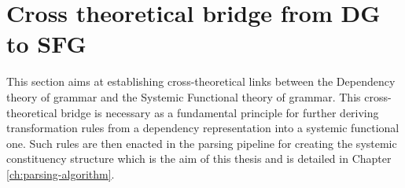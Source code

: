 
\section{Cross theoretical bridge from DG to SFG}
\label{sec:cross-theoretical-bridge}
    


%
    This section aims at establishing cross-theoretical links between the Dependency theory of grammar and the Systemic Functional theory of grammar. This cross-theoretical bridge is necessary as a fundamental principle for further deriving transformation rules from a dependency representation into a systemic functional one. Such rules are then enacted in the parsing pipeline for creating the systemic constituency structure which is the aim of this thesis and is detailed in Chapter \ref{ch:parsing-algorithm}.


